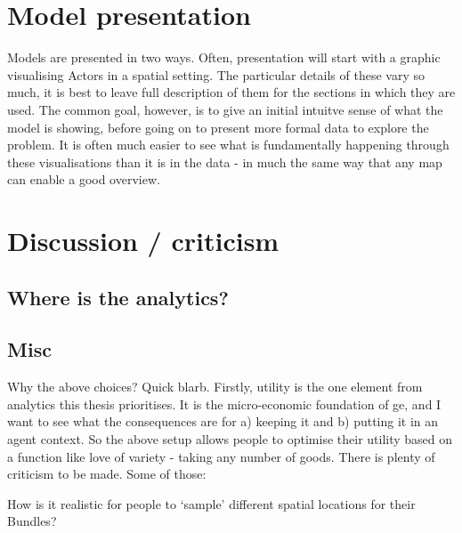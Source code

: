 \section{Model presentation \label{}}

Models are presented in two ways. Often, presentation will start with a graphic visualising Actors in a spatial setting. The particular details of these vary so much, it is best to leave full description of them for the sections in which they are used. The common goal, however, is to give an initial intuitve sense of what the model is showing, before going on to present more formal data to explore the problem. It is often much easier to see what is fundamentally happening through these visualisations than it is in the data - in much the same way that any map can enable a good overview.

\section{Discussion / criticism \label{}}

\subsection{Where is the analytics? \label{sec:analyticsInFramework}}


\subsection{Misc}


Why the above choices? Quick blarb. Firstly, utility is the one element from analytics this thesis prioritises. It is the micro-economic foundation of \gls{ge}, and I want to see what the consequences are for a) keeping it and b) putting it in an agent context. So the above setup allows people to optimise their utility based on a function like love of variety - taking any number of goods. There is plenty of criticism to be made. Some of those:

How is it realistic for people to `sample' different spatial locations for their Bundles?

